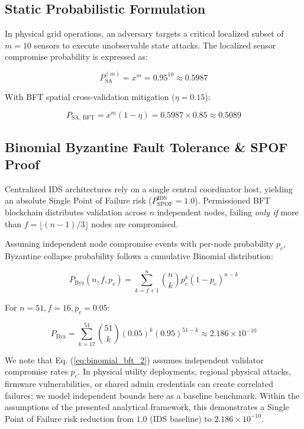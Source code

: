 \documentclass[10pt,twocolumn,journal]{IEEEtran}
\begin{document}
\subsection{Static Probabilistic Formulation}
In physical grid operations, an adversary targets a critical localized subset of $m=10$ sensors to execute unobservable state attacks. The localized sensor compromise probability is expressed as:

\begin{equation}
P_{\text{SA}}^{(m)} = x^m = 0.95^{10} \approx 0.5987
\end{equation}

With BFT spatial cross-validation mitigation ($\eta = 0.15$):

\begin{equation}
P_{\text{SA, BFT}} = x^m (1 - \eta) = 0.5987 \times 0.85 \approx 0.5089
\end{equation}

\subsection{Binomial Byzantine Fault Tolerance & SPOF Proof}
Centralized IDS architectures rely on a single central coordinator host, yielding an absolute Single Point of Failure risk ($P_{\text{SPOF}}^{\text{IDS}} = 1.0$). Permissioned BFT blockchain distributes validation across $n$ independent nodes, failing \emph{only if} more than $f = \lfloor(n-1)/3\rfloor$ nodes are compromised.

Assuming independent node compromise events with per-node probability $p_c$, Byzantine collapse probability follows a cumulative Binomial distribution:

\begin{equation}
P_{\text{Byz}}(n, f, p_c) = \sum_{k=f+1}^{n} \binom{n}{k} p_c^k (1 - p_c)^{n-k}
\label{eq:binomial_bft_2}
\end{equation}

For $n=51, f=16, p_c=0.05$:

\begin{equation}
P_{\text{Byz}} = \sum_{k=17}^{51} \binom{51}{k} (0.05)^k (0.95)^{51-k} \approx 2.186 \times 10^{-10}
\end{equation}

We note that Eq. (\ref{eq:binomial_bft_2}) assumes independent validator compromise rates $p_c$. In physical utility deployments, regional physical attacks, firmware vulnerabilities, or shared admin credentials can create correlated failures; we model independent bounds here as a baseline benchmark. Within the assumptions of the presented analytical framework, this demonstrates a Single Point of Failure risk reduction from $1.0$ (IDS baseline) to $2.186 \times 10^{-10}$.
\end{document}
